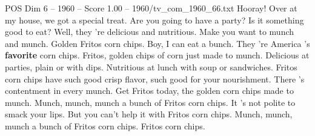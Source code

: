 \begin{textsample}{POS Dim 6 – 1960 – Score 1.00 – 1960/tv\_com\_1960\_66.txt}  \label{ex:f6_pos_026}
Hooray!
Over at my house, we got a special treat.
Are you going to have a party?
Is it something good to eat?
Well, they 're delicious and nutritious.
Make you want to munch and munch.
Golden Fritos corn chips.
Boy, I can eat a bunch.
They 're America 's \textbf{favorite} corn chips.
Fritos, golden chips of corn just made to munch.
Delicious at parties, plain or with dips.
Nutritious at lunch with soup or sandwiches.
Fritos corn chips have such good crisp flavor, such good for your nourishment.
There 's contentment in every munch.
Get Fritos today, the golden corn chips made to munch.
Munch, munch, munch a bunch of Fritos corn chips.
It 's not polite to smack your lips.
But you can't help it with Fritos corn chips.
Munch, munch, munch a bunch of Fritos corn chips.
Fritos corn chips.

\end{textsample}
